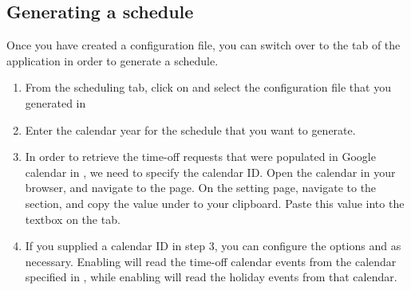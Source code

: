 \documentclass[letterpaper,10pt,english]{sphinxmanual}
\begin{document}
\subsection{Generating a schedule}
\label{\detokenize{index:generating-a-schedule}}\label{\detokenize{index:id4}}
Once you have created a configuration file, you can switch over to the
 tab of the application in order to generate a schedule.
\begin{enumerate}
\item {} 
From the scheduling tab, click on  and select the configuration
file that you generated in {\hyperref[\detokenize{index:clinician-configuration}]{}}

\end{enumerate}
\begin{enumerate}
\setcounter{enumi}{1}
\item {} 
Enter the calendar year for the schedule that you want to generate.

\end{enumerate}
\begin{enumerate}
\setcounter{enumi}{2}
\item {} 
 In order to retrieve the time-off requests that were populated
in Google calendar in {\hyperref[\detokenize{index:adding-clinician-requests}]{}}, we need to specify the
calendar ID. Open the calendar in your browser, and navigate to the
 page.
On the setting page, navigate to the  section, and copy
the value under  to your clipboard.
Paste this value into the  textbox on the 
tab.

\end{enumerate}
\begin{enumerate}
\setcounter{enumi}{3}
\item {} 
 If you supplied a calendar ID in step 3, you can configure
the options  and  as necessary.
Enabling  will read the time-off calendar events
from the calendar specified in , while enabling
 will read the holiday events from that calendar.

\end{enumerate}
\end{document}
